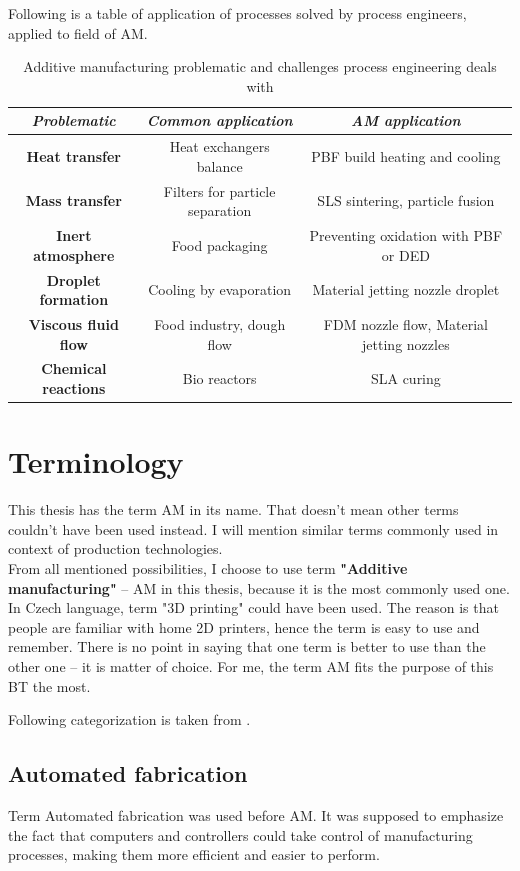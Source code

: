 \documentclass[a4paper, twoside, 11pt]{report}
\begin{document}
	Following is a table of application of processes solved by process engineers, applied to field of AM.
\\[10pt]
\begin{table}
\begin{tabular}{||c||c||c|}
\hline 
\textit{Problematic} & \textit{Common application} & \textit{AM application} \\ 
\hline 
\textbf{Heat transfer} & Heat exchangers balance & PBF build heating and cooling \\
\hline
\textbf{Mass transfer} & Filters for particle separation & SLS sintering, particle fusion \\ 
\hline 
\textbf{Inert atmosphere} & Food packaging & Preventing oxidation with PBF or DED\\
\hline 
\textbf{Droplet formation} & Cooling by evaporation & Material jetting nozzle droplet \\ 
\hline 
\textbf{Viscous fluid flow} & Food industry, dough flow & FDM nozzle flow, Material jetting nozzles\\ 
\hline 
\textbf{Chemical reactions} & Bio reactors & SLA curing\\ 
\hline 
\end{tabular}
\caption{Additive manufacturing problematic and challenges process engineering deals with}
\end{table}
%
\section{Terminology}
This thesis has the term AM in its name. That doesn't mean other terms couldn't have been used instead. I will mention similar terms commonly used in context of production technologies.\\
From all mentioned possibilities, I choose to use term \textbf{"Additive manufacturing"} – AM in this thesis, because it is the most commonly used one. In Czech language, term "3D printing" could have been used. The reason is that people are familiar with home 2D printers, hence the term is easy to use and remember. There is no point in saying that one term is better to use than the other one – it is matter of choice. For me, the term AM fits the purpose of this BT the most.

	Following categorization is taken from \cite[p. 7]{AMT}.

\subsection{Automated fabrication}
Term Automated fabrication was used before AM. It was supposed to emphasize the fact that computers and controllers could take control of manufacturing processes, making them more efficient and easier to perform.
\end{document}
